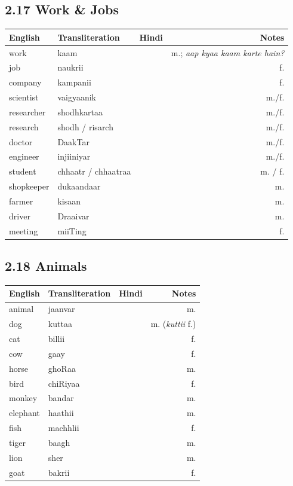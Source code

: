 \subsection{2.17 Work \& Jobs}

\begin{tabular}{@{}VTDN@{}}
  \toprule
  English & Transliteration & Hindi & Notes \\
  \midrule
  work & kaam &  & m.; \textit{aap kyaa kaam karte hain?} \\
  job & naukrii &  & f. \\
  company & kampanii &  & f. \\
  scientist & vaigyaanik &  & m./f. \\
  researcher & shodhkartaa &  & m./f. \\
  research & shodh / risarch &  & m./f. \\
  doctor & DaakTar &  & m./f. \\
  engineer & injiiniyar &  & m./f. \\
  student & chhaatr / chhaatraa &  & m. / f. \\
  shopkeeper & dukaandaar &  & m. \\
  farmer & kisaan &  & m. \\
  driver & Draaivar &  & m. \\
  meeting & miiTing &  & f. \\
  \bottomrule
\end{tabular}

\subsection{2.18 Animals}

\begin{tabular}{@{}VTDN@{}}
  \toprule
  English & Transliteration & Hindi & Notes \\
  \midrule
  animal & jaanvar &  & m. \\
  dog & kuttaa &  & m. (\textit{kuttii} f.) \\
  cat & billii &  & f. \\
  cow & gaay &  & f. \\
  horse & ghoRaa &  & m. \\
  bird & chiRiyaa &  & f. \\
  monkey & bandar &  & m. \\
  elephant & haathii &  & m. \\
  fish & machhlii &  & f. \\
  tiger & baagh &  & m. \\
  lion & sher &  & m. \\
  goat & bakrii &  & f. \\
  \bottomrule
\end{tabular}

